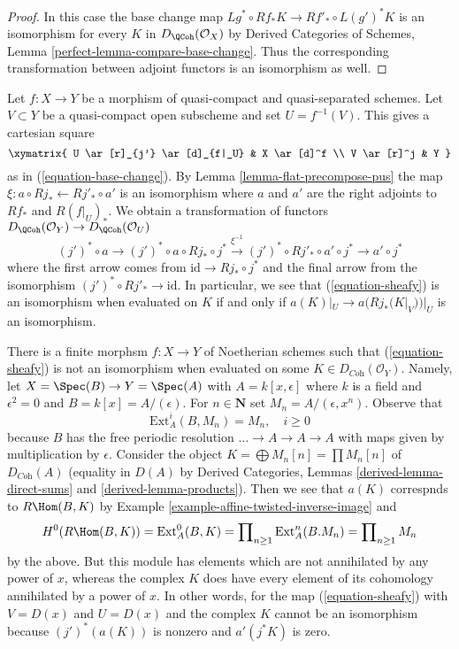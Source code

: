\begin{proof}
In this case the base change map
$Lg^* \circ Rf_* K \longrightarrow Rf'_* \circ L(g')^*K$
is an isomorphism for every $K$ in $D_\QCoh(\mathcal{O}_X)$ by
Derived Categories of Schemes, Lemma \ref{perfect-lemma-compare-base-change}.
Thus the corresponding transformation between adjoint functors
is an isomorphism as well.
\end{proof}

\noindent
Let $f : X \to Y$ be a morphism of quasi-compact and quasi-separated
schemes. Let $V \subset Y$ be a quasi-compact open subscheme and set
$U = f^{-1}(V)$. This gives a cartesian square
$$
\xymatrix{
U \ar[r]_{j'} \ar[d]_{f|_U} & X \ar[d]^f \\
V \ar[r]^j & Y
}
$$
as in (\ref{equation-base-change}). By Lemma \ref{lemma-flat-precompose-pus}
the map $\xi : a \circ Rj_* \leftarrow Rj'_* \circ a'$ is an isomorphism
where $a$ and $a'$ are the right adjoints to
$Rf_*$ and $R(f|_U)_*$. We obtain a transformation
of functors $D_\QCoh(\mathcal{O}_Y) \to D_\QCoh(\mathcal{O}_U)$
\begin{equation}
\label{equation-sheafy}
(j')^* \circ a \to
(j')^* \circ a \circ Rj_* \circ j^* \xrightarrow{\xi^{-1}}
(j')^* \circ Rj'_* \circ a' \circ j^* \to a' \circ j^*
\end{equation}
where the first arrow comes from $\text{id} \to Rj_* \circ j^*$
and the final arrow from the isomorphism $(j')^* \circ Rj'_* \to \text{id}$.
In particular, we see that (\ref{equation-sheafy}) is an isomorphism
when evaluated on $K$ if and only if $a(K)|_U \to a(Rj_*(K|_V))|_U$
is an isomorphism.

\begin{example}
\label{example-not-supported-on-inverse-image}
There is a finite morphsm $f : X \to Y$ of Noetherian schemes
such that (\ref{equation-sheafy}) is not an isomorphism
when evaluated on some
$K \in D_{\textit{Coh}}(\mathcal{O}_Y)$.
Namely, let $X = \Spec(B) \to Y = \Spec(A)$ with
$A = k[x, \epsilon]$ where $k$ is a field and $\epsilon^2 = 0$ and
$B = k[x] = A/(\epsilon)$. For $n \in \mathbf{N}$ set
$M_n = A/(\epsilon, x^n)$. Observe that
$$
\text{Ext}^i_A(B, M_n) = M_n,\quad i \geq 0
$$
because $B$ has the free periodic resolution
$\ldots \to A \to A \to A$ with maps given by multiplication by $\epsilon$.
Consider the object
$K = \bigoplus M_n[n] = \prod M_n[n]$
of $D_{\textit{Coh}}(A)$ (equality in $D(A)$ by
Derived Categories, Lemmas \ref{derived-lemma-direct-sums} and
\ref{derived-lemma-products}). Then we see that $a(K)$ correspnds
to $R\Hom(B, K)$ by Example \ref{example-affine-twisted-inverse-image} and
$$
H^0(R\Hom(B, K)) = \text{Ext}^0_A(B, K) =
\prod\nolimits_{n \geq 1} \text{Ext}^n_A(B. M_n) = 
\prod\nolimits_{n \geq 1} M_n
$$
by the above. But this module has elements which are not
annihilated by any power of $x$, whereas the complex $K$
does have every element of its cohomology annihilated by
a power of $x$. In other words, for the map (\ref{equation-sheafy})
with $V = D(x)$ and $U = D(x)$ and the complex $K$ cannot
be an isomorphism because $(j')^*(a(K))$ is nonzero and
$a'(j^*K)$ is zero.
\end{example}

